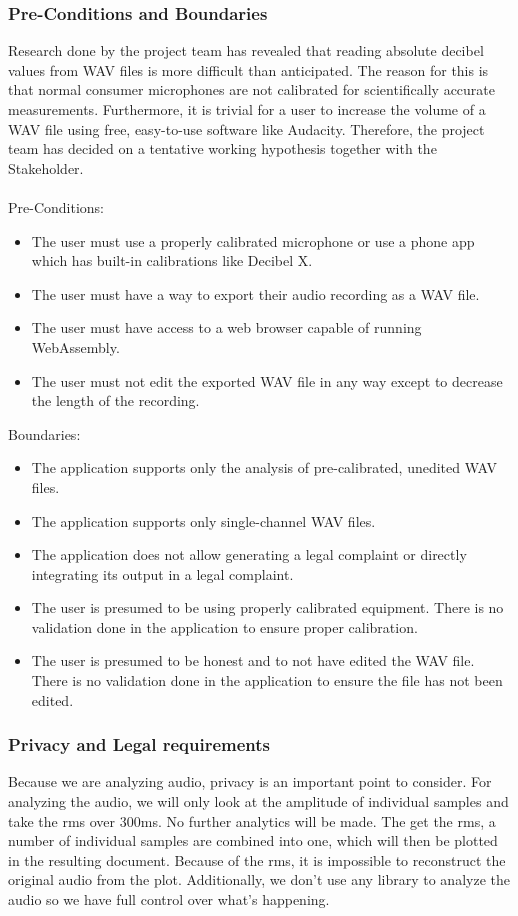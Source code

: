 \subsubsection{Pre-Conditions and Boundaries}\label{subsubsec:pre_conditions_and_boundaries}
Research done by the project team has revealed that reading absolute decibel values from WAV files is more difficult than anticipated.
The reason for this is that normal consumer microphones are not calibrated for scientifically accurate measurements\cite{stackoverflow_spl}. Furthermore, it is trivial for a user
to increase the volume of a WAV file using free, easy-to-use software like Audacity\cite{audacity,audacity_amplify}.
Therefore, the project team has decided on a tentative working hypothesis together with the Stakeholder. \\~\\
Pre-Conditions:
\begin{itemize}
    \item The user must use a properly calibrated microphone or use a phone app which has built-in calibrations like Decibel X\cite{decibelx_ios}\cite{decibelx_android}.
    \item The user must have a way to export their audio recording as a WAV file.
    \item The user must have access to a web browser capable of running WebAssembly.
    \item The user must not edit the exported WAV file in any way except to decrease the length of the recording.
\end{itemize}
Boundaries:
\begin{itemize}
    \item The application supports only the analysis of pre-calibrated, unedited WAV files.
    \item The application supports only single-channel WAV files.
    \item The application does not allow generating a legal complaint or directly integrating its output in a legal complaint.
    \item The user is presumed to be using properly calibrated equipment.
          There is no validation done in the application to ensure proper calibration.
    \item The user is presumed to be honest and to not have edited the WAV file.
          There is no validation done in the application to ensure the file has not been edited.
\end{itemize}

\subsubsection{Privacy and Legal requirements}
Because we are analyzing audio, privacy is an important point to consider.
For analyzing the audio, we will only look at the amplitude of individual samples and take the rms over 300ms.
No further analytics will be made.
The get the rms, a number of individual samples are combined into one, which will then be plotted in the resulting document.
Because of the rms, it is impossible to reconstruct the original audio from the plot.
Additionally, we don't use any library to analyze the audio so we have full control over what's happening.

